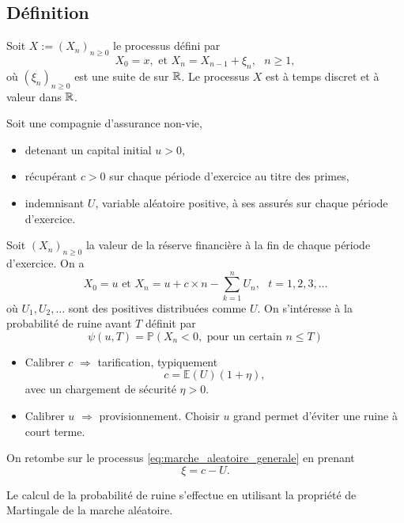 \subsection{Définition}\label{ssec:definition}
Soit $X:= (X_n)_{n\geq0}$ le processus défini par 
\begin{equation}\label{eq:marche_aleatoire_generale}
X_0 = x,\text{ et }X_n = X_{n-1}+\xi_n,\text{ }n\geq 1,
\end{equation}
où $(\xi_n)_{n\geq0}$ est une suite de \va \iid sur $\mathbb{R}$. Le processus $X$ est à temps discret et à valeur dans $\mathbb{R}$.
\begin{ex}\label{ex:ruine_discret}
Soit une compagnie d'assurance non-vie,
\begin{itemize}
\item detenant un capital initial $u>0$,
\item récupérant $c>0$ sur chaque période d'exercice au titre des primes,
\item indemnisant $U$, variable aléatoire positive, à ses assurés sur chaque période d'exercice.
\end{itemize}
Soit $(X_n)_{n\geq0}$ la valeur de la réserve financière à la fin de chaque période d'exercice. On a
$$
X_0=u\text{ et }X_n=u+c\times n - \sum_{k=1}^{n}U_n,\text{ }t=1,2,3,\ldots
$$
où $U_1,U_2,\ldots$ sont des \va \iid positives distribuées comme $U$. On s'intéresse à la probabilité de ruine avant $T$ définit par
$$
\psi(u,T)=\mathbb{P}(X_n<0,\text{ pour un certain }n\leq T)
$$
\begin{itemize}
\item Calibrer $c$ $\Rightarrow$ tarification, typiquement
$$
c=\mathbb{E}(U)(1+\eta),
$$
avec un chargement de sécurité $\eta>0$.
\item Calibrer $u$ $\Rightarrow$ provisionnement. Choisir $u$ grand permet d'éviter une ruine à court terme.
\end{itemize}
On retombe sur le processus \eqref{eq:marche_aleatoire_generale} en prenant 
$$
\xi = c - U.
$$
\end{ex}
Le calcul de la probabilité de ruine s'effectue en utilisant la propriété de Martingale de la marche aléatoire. 
